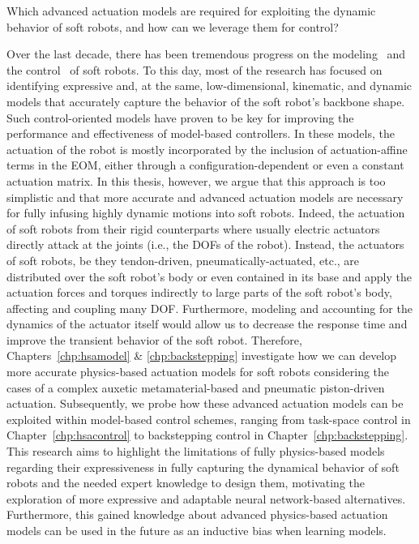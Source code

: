 \begin{researchquestion}\label{rq:actuation_models}
    Which advanced actuation models are required for exploiting the dynamic behavior of soft robots, and how can we leverage them for control? 
\end{researchquestion}
Over the last decade, there has been tremendous progress on the modeling~\cite{armanini2023soft} and the control~\cite{della2023model} of soft robots.
To this day, most of the research has focused on identifying expressive and, at the same, low-dimensional, kinematic, and dynamic models that accurately capture the behavior of the soft robot's backbone shape. Such control-oriented models have proven to be key for improving the performance and effectiveness of model-based controllers.
In these models, the actuation of the robot is mostly incorporated by the inclusion of actuation-affine terms in the \gls{EOM}, either through a configuration-dependent or even a constant actuation matrix.
In this thesis, however, we argue that this approach is too simplistic and that more accurate and advanced actuation models are necessary for fully infusing highly dynamic motions into soft robots.
Indeed, the actuation of soft robots from their rigid counterparts where usually electric actuators directly attack at the joints (i.e., the \glspl{DOF} of the robot). Instead, the actuators of soft robots, be they tendon-driven, pneumatically-actuated, etc., are distributed over the soft robot's body or even contained in its base and apply the actuation forces and torques indirectly to large parts of the soft robot's body, affecting and coupling many \gls{DOF}. 
Furthermore, modeling and accounting for the dynamics of the actuator itself would allow us to decrease the response time and improve the transient behavior of the soft robot.
Therefore, Chapters~\ref{chp:hsamodel} \& \ref{chp:backstepping} investigate how we can develop more accurate physics-based actuation models for soft robots considering the cases of a complex auxetic metamaterial-based and pneumatic piston-driven actuation.
Subsequently, we probe how these advanced actuation models can be exploited within model-based control schemes, ranging from task-space control in Chapter~\ref{chp:hsacontrol} to backstepping control in Chapter~\ref{chp:backstepping}.
This research aims to highlight the limitations of fully physics-based models regarding their expressiveness in fully capturing the dynamical behavior of soft robots and the needed expert knowledge to design them, motivating the exploration of more expressive and adaptable neural network-based alternatives.
Furthermore, this gained knowledge about advanced physics-based actuation models can be used in the future as an inductive bias when learning models.

